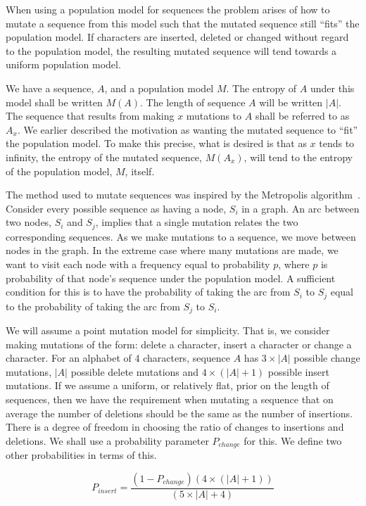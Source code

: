 \documentclass[letterpaper,11pt,oneside]{article}
\begin{document}
When using a population model for sequences the problem arises of how to
mutate a sequence from this model such that the mutated sequence still
``fits'' the population model.  If characters are inserted, deleted or changed
without regard to the population model, the resulting mutated sequence will
tend towards a uniform population model.

We have a sequence, $A$, and a population model $M$.  The entropy of $A$ under
this model shall be written $M(A)$.  The length of sequence $A$ will be
written $|A|$.  The sequence that results from making $x$ mutations to $A$
shall be referred to as $A_x$.  We earlier described the motivation as wanting
the mutated sequence to ``fit'' the population model.  To make this precise,
what is desired is that as $x$ tends to infinity, the entropy of the mutated
sequence, $M(A_x)$, will tend to the entropy of the population model, $M$,
itself.

The method used to mutate sequences was inspired by the Metropolis
algorithm~\cite{metropolis53}.  Consider every possible sequence as having a
node, $S_i$ in a graph.  An arc between two nodes, $S_i$ and $S_j$, implies
that a single mutation relates the two corresponding sequences.  As we make
mutations to a sequence, we move between nodes in the graph.  In the extreme
case where many mutations are made, we want to visit each node with a
frequency equal to probability $p$, where $p$ is probability of that node's
sequence under the population model.  A sufficient condition for this is to
have the probability of taking the arc from $S_i$ to $S_j$ equal to the
probability of taking the arc from $S_j$ to $S_i$.

We will assume a point mutation model for simplicity.  That is, we consider
making mutations of the form: delete a character, insert a character or change
a character.  For an alphabet of 4 characters, sequence $A$ has $3\times|A|$
possible change mutations, $|A|$ possible delete mutations and
$4\times(|A|+1)$ possible insert mutations.  If we assume a uniform, or
relatively flat, prior on the length of sequences, then we have the
requirement when mutating a sequence that on average the number of deletions
should be the same as the number of insertions.  There is a degree of freedom
in choosing the ratio of changes to insertions and deletions.  We shall use a
probability parameter $P_{change}$ for this.  We define two other probabilities
in terms of this.

$$P_{insert} = \frac{(1-P_{change})(4\times(|A|+1))}{(5\times|A|+4)}$$
\end{document}
